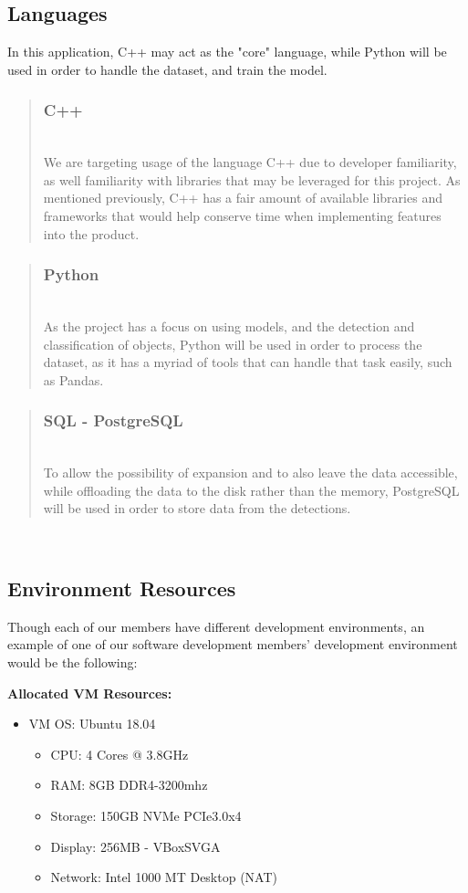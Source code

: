 \documentclass[conference]{IEEEtran}
\begin{document}
\subsection{Languages}
In this application, C++ may act as the "core" language, while Python will be used in order to handle the dataset, and train the model.\\
\begin{quote}
\subsubsection{C++}~\\
We are targeting usage of the language C++ due to developer familiarity, as well familiarity with libraries that may be leveraged for this project. 
As mentioned previously, C++ has a fair amount of available libraries and frameworks that would help conserve time when implementing features into the product.
\end{quote}
\begin{quote}
\subsubsection{Python}~\\
As the project has a focus on using models, and the detection and classification of objects, Python will be used in order to process the dataset, as it has a myriad of tools that can handle that task easily, such as Pandas.
\end{quote}
\begin{quote}
\subsubsection{SQL - PostgreSQL}~\\
To allow the possibility of expansion and to also leave the data accessible, while offloading the data to the disk rather than the memory, PostgreSQL will be used in order to store data from the detections.
\end{quote}~\\

\subsection{Environment Resources}
Though each of our members have different development environments, an example of one of our software development members' development environment would be the following:

\textbf{Allocated VM Resources:}
\begin{itemize}
\item VM OS: Ubuntu 18.04
\begin{itemize}
\item CPU: 4 Cores @ 3.8GHz
\item RAM: 8GB DDR4-3200mhz
\item Storage: 150GB NVMe PCIe3.0x4
\item Display: 256MB - VBoxSVGA
\item Network: Intel 1000 MT Desktop (NAT)
\end{itemize}
\end{itemize}~\\
\end{document}

